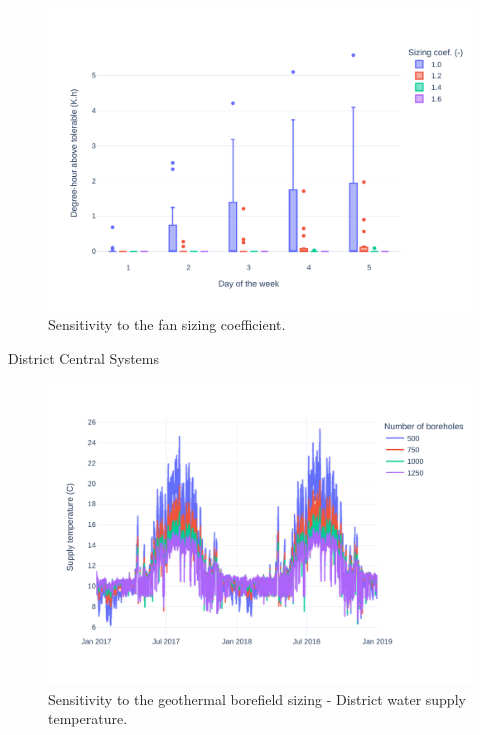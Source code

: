 \begin{figure}[!htbp]
\centering
\includegraphics[width=\linewidth]{figures/FanSizing.pdf}
\caption{Sensitivity to the fan sizing coefficient.}
\label{fig:fan}
\end{figure}

District Central Systems

\begin{figure}[!htbp]
\centering
\includegraphics[width=\linewidth]{figures/GeoSizing.pdf}
\caption{Sensitivity to the geothermal borefield sizing - District water supply temperature.}
\label{fig:geo_sizing}
\end{figure}

